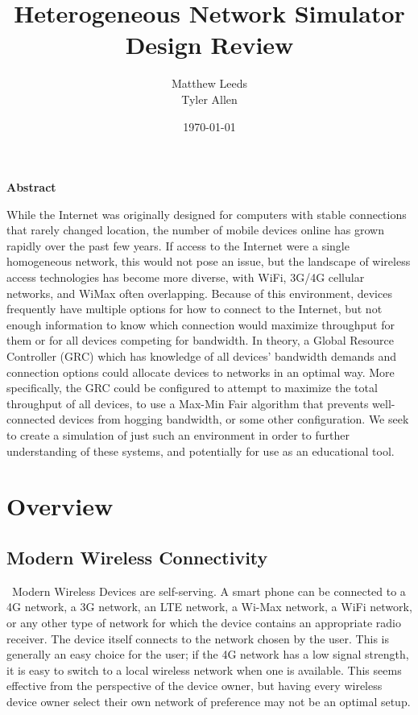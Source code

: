 \documentclass[11pt]{article}
\title{Heterogeneous Network Simulator Design Review}
\author{Matthew Leeds\\
	Tyler Allen\\}
\date{\today}
\begin{document}
\maketitle

{\setlength{\parindent}{0cm} \large \textbf{Abstract}}

While the Internet was originally designed for computers with stable connections that rarely changed location, the number of mobile devices online has grown rapidly over the past few years. If access to the Internet were a single homogeneous network, this would not pose an issue, but the landscape of wireless access technologies has become more diverse, with WiFi, 3G/4G cellular networks, and WiMax often overlapping. Because of this environment, devices frequently have multiple options for how to connect to the Internet, but not enough information to know which connection would maximize throughput for them or for all devices competing for bandwidth. In theory, a Global Resource Controller (GRC) which has knowledge of all devices' bandwidth demands and connection options could allocate devices to networks in an optimal way. More specifically, the GRC could be configured to attempt to maximize the total throughput of all devices, to use a Max-Min Fair algorithm that prevents well-connected devices from hogging bandwidth, or some other configuration. We seek to create a simulation of just such an environment in order to further understanding of these systems, and potentially for use as an educational tool.

\section{Overview}
\subsection{Modern Wireless Connectivity}
~\indent Modern Wireless Devices are self-serving. A smart phone can be connected to a
4G network, a 3G network, an LTE network, a Wi-Max network, a WiFi network, 
or any other type of network for which the device contains an appropriate 
radio receiver. The device itself connects to the network chosen by the user. 
This is generally an easy choice for the user; if the 4G network has a 
low signal strength, it is easy to switch to a local wireless network when one 
is available. This seems effective from the perspective of the device owner, 
but having every wireless device owner select their own network of preference 
may not be an optimal setup.
\end{document}
